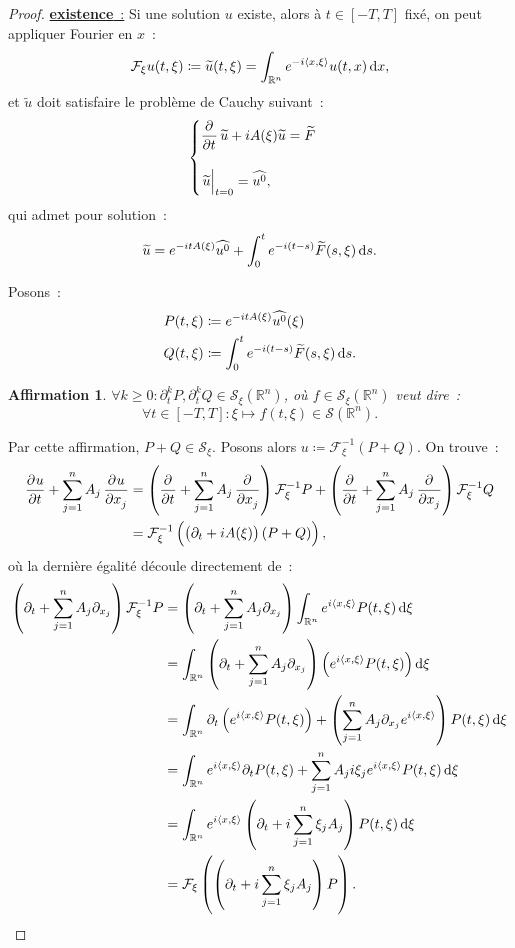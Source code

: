 \documentclass{report}
\newcommand{\R}{{\mathbb R}}
\newcommand{\scpr}[2]{\left\langle#1, #2\right\rangle}
\newcommand{\restr}[2]{\left.#1\vphantom{\big|}\right|_{#2}}
\newcommand{\exis}{{\underline {\textbf{existence}~:}} }
\newtheorem{claim}[thm]{Affirmation}
\theoremstyle{definition}
\theoremstyle{remark}
\begin{document}
\begin{proof}
\exis Si une solution $u$ existe, alors à $t \in [-T, T]$ fixé, on peut appliquer Fourier en $x$~:
\[\mathcal F_\xi u(t, \xi) \coloneqq \widetilde u(t, \xi) = \int_{\mathbb R^n}e^{-i\scpr x\xi}u(t, x)\dif x,\]
et $\widetilde u$ doit satisfaire le problème de Cauchy suivant~:
\[\begin{cases}
	\dpd {}t\widetilde u + iA(\xi)\widetilde u = \widetilde F \\&\\
	\restr {\widetilde u}{t=0} = \widehat {u^0},
\end{cases}\]
qui admet pour solution~:
\[\widetilde u = e^{-itA(\xi)}\widehat {u^0} + \int_0^te^{-i(t-s)}\widetilde F(s, \xi)\dif s.\]

Posons~:
\begin{align*}
	P(t, \xi) &\coloneqq e^{-itA(\xi)}\widehat {u^0}(\xi) \\
	Q(t, \xi) &\coloneqq \int_0^te^{-i(t-s)}\widetilde F(s, \xi)\dif s.
\end{align*}

\begin{claim}\label{claim 1} $\forall k \geq 0 : \partial_t^kP, \partial_t^kQ \in \mathcal S_\xi(\R^n)$, où $f \in \mathcal S_\xi(\R^n)$ veut dire~:
\[\forall t \in [-T, T] : \xi \mapsto f(t, \xi) \in \mathcal S(\R^n).\]
\end{claim}

Par cette affirmation, $P+Q \in \mathcal S_\xi$. Posons alors $u \coloneqq \mathcal F_\xi^{-1}(P+Q)$. On trouve~:
\begin{align*}
	\dpd ut + \sum_{j=1}^nA_j\dpd u{x_j}
	&= \left(\dpd {}t + \sum_{j=1}^nA_j \dpd{}{x_j}\right)\mathcal F_\xi^{-1}P + \left(\dpd {}t + \sum_{j=1}^nA_j\dpd {}{x_j}\right)\mathcal F_\xi^{-1}Q \\
	&= \mathcal F_\xi^{-1}\left(\left(\partial_t + iA(\xi)\right)(P+Q)\right),
\end{align*}
où la dernière égalité découle directement de~:
\begin{align*}
\left(\partial_t + \sum_{j=1}^nA_j\partial_{x_j}\right)\mathcal F_\xi^{-1}P &= \left(\partial_t + \sum_{j=1}^nA_j\partial_{x_j}\right)\int_{\R^n}e^{i\scpr x\xi}P(t,\xi)\dif\xi\\
	&= \int_{\R^n}\left(\partial_t + \sum_{j=1}^nA_j\partial_{x_j}\right)\left(e^{i\scpr x\xi}P(t,\xi)\right)\dif\xi \\
	&= \int_{\R^n}\partial_t\left(e^{i\scpr x\xi}P(t,\xi)\right) + \left(\sum_{j=1}^nA_j\partial_{x_j}e^{i\scpr x\xi}\right)P(t,\xi)\dif\xi \\
	&= \int_{\R^n}e^{i\scpr x\xi}\partial_tP(t,\xi) + \sum_{j=1}^nA_ji\xi_je^{i\scpr x\xi}P(t,\xi)\dif \xi \\
	&= \int_{\R^n}e^{i\scpr x\xi}\left(\partial_t + i\sum_{j=1}^n\xi_jA_j\right)P(t,\xi)\dif\xi \\
	&= \mathcal F_\xi\left(\left(\partial_t + i\sum_{j=1}^n\xi_jA_j\right)P\right).
\end{align*}


\end{proof}
\end{document}

